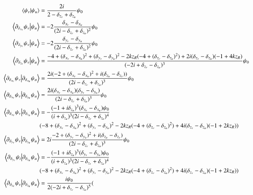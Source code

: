 \documentclass[reprint,amsmath,amssymb,aps,pra,floatfix]{revtex4-2}
\begin{document}
\begin{align}
    \braket{\psi_v}{\psi_u} &= \frac{2 i}{2 - \delta_{z_v} + \delta_{z_u}} \psi_0 \\
    \braket{\partial_{\delta_{x_v}}\psi_v}{\psi_u} &=  -2 \frac{\delta_{x_v} - \delta_{x_u}}{(2i - \delta_{z_v} + \delta_{z_u})^2} \psi_0\\
    \braket{\partial_{\delta_{y_v}}\psi_v}{\psi_u} &=  -2 \frac{\delta_{y_v} - \delta_{y_u}}{(2i - \delta_{z_v} + \delta_{z_u})^2} \psi_0\\
    \braket{\partial_{\delta_{z_v}}\psi_v}{\psi_u} &= \frac{-4 + (\delta_{x_v} - \delta_{x_u})^2 + (\delta_{y_v} - \delta_{y_u})^2 - 2 k z_R (-4 + (\delta_{z_v} - \delta_{z_u})^2) +  2i (\delta_{z_v} - \delta_{z_u})  (-1 + 4 k z_R)
    }{(-2i + \delta_{z_v} - \delta_{z_u})^3} \psi_0 \\
    \braket{\partial_{\delta_{x_v}}\psi_v}{\partial_{\delta_{x_u}}\psi_u} &= \frac{2i (-2 + (\delta_{x_v} - \delta_{x_u})^2 + i (\delta_{z_u} - \delta_{z_v}))}{(2i - \delta_{z_v} + \delta_{z_u})^3} \psi_0 \\
    \braket{\partial_{\delta_{x_v}}\psi_v}{\partial_{\delta_{y_u}}\psi_u} &= \frac{2i (\delta_{x_v} - \delta_{x_u}) (\delta_{y_v} - \delta_{y_u})}{ (2i - \delta_{z_v} + \delta_{z_u})^3} \psi_0 \\
    \braket{\partial_{\delta_{x_v}}\psi_v}{\partial_{\delta_{z_u}}\psi_u} &= -\frac{(-1 + i \delta_{z_u})^3 (\delta_{x_v} - \delta_{x_u}) \psi_0}{(i + \delta_{z_u})^3 (2i - \delta_{z_v} + \delta_{z_u})^4} \\
    &(-8 + (\delta_{x_v} - \delta_{x_u})^2 + (\delta_{y_v} - \delta_{y_u})^2  - 2 k z_R (-4 + (\delta_{z_v} - \delta_{z_u})^2) + 4i (\delta_{z_v} - \delta_{z_u}) (-1 + 2 k z_R)) \nonumber \\
    \braket{\partial_{\delta_{y_v}}\psi_v}{\partial_{\delta_{y_u}}\psi_u} &= 2i \frac{-2 + (\delta_{y_v} - \delta_{y_u})^2 + i (\delta_{z_u} - \delta_{z_v})}{ (2i - \delta_{z_v} + \delta_{z_u})^3} \psi_0\\
    \braket{\partial_{\delta_{y_v}}\psi_i}{\partial_{\delta_{z_u}}\psi_u} &= - \frac{(-1 + i \delta_{z_u})^3 (\delta_{y_v} - \delta_{y_u}) \psi_0}{(i + \delta_{z_u})^3 (2i - \delta_{z_v} + \delta_{z_u})^4}  \\
    & (-8 + (\delta_{x_v} - \delta_{x_u})^2 + (\delta_{y_v} - \delta_{y_u})^2 - 2 k z_R (-4 + (\delta_{z_v} - \delta_{z_u})^2) + 4i (\delta_{z_v} - \delta_{z_u}) (-1 + 2 k z_R)) \nonumber \\
    \braket{\partial_{\delta_{z_v}}\psi_v}{\partial_{\delta_{z_u}}\psi_u} &= \frac{i \psi_0}{2 (-2i + \delta_{z_v} - \delta_{z_u})^5} (  \\

\end{align}
\end{document}
